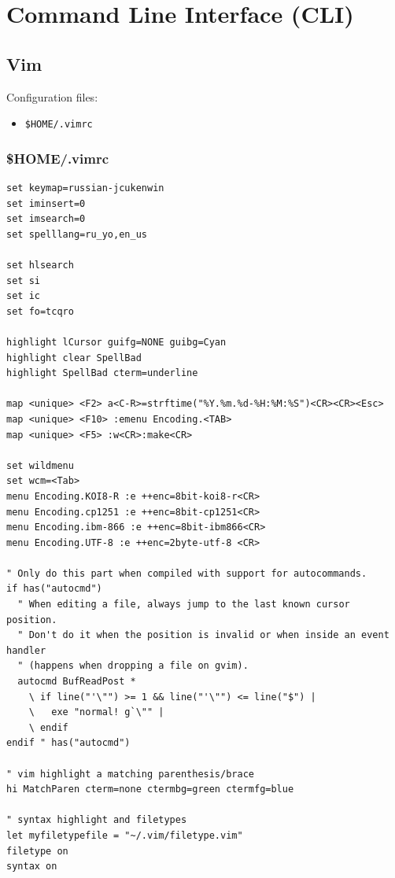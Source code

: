 \documentclass[12pt,a4paper]{article}
\begin{document}
\section{Command Line Interface (CLI)}

\subsection{Vim}

Configuration files:

\begin{itemize}
\item \verb"$HOME/.vimrc"
\end{itemize}

\subsubsection{\$HOME/.vimrc}

\begin{verbatim}
set keymap=russian-jcukenwin
set iminsert=0
set imsearch=0
set spelllang=ru_yo,en_us

set hlsearch
set si
set ic
set fo=tcqro

highlight lCursor guifg=NONE guibg=Cyan
highlight clear SpellBad
highlight SpellBad cterm=underline

map <unique> <F2> a<C-R>=strftime("%Y.%m.%d-%H:%M:%S")<CR><CR><Esc>
map <unique> <F10> :emenu Encoding.<TAB>
map <unique> <F5> :w<CR>:make<CR>

set wildmenu
set wcm=<Tab>
menu Encoding.KOI8-R :e ++enc=8bit-koi8-r<CR>
menu Encoding.cp1251 :e ++enc=8bit-cp1251<CR>
menu Encoding.ibm-866 :e ++enc=8bit-ibm866<CR>
menu Encoding.UTF-8 :e ++enc=2byte-utf-8 <CR>

" Only do this part when compiled with support for autocommands.
if has("autocmd")
  " When editing a file, always jump to the last known cursor position.
  " Don't do it when the position is invalid or when inside an event handler
  " (happens when dropping a file on gvim).
  autocmd BufReadPost *
    \ if line("'\"") >= 1 && line("'\"") <= line("$") |
    \   exe "normal! g`\"" |
    \ endif
endif " has("autocmd")

" vim highlight a matching parenthesis/brace
hi MatchParen cterm=none ctermbg=green ctermfg=blue

" syntax highlight and filetypes
let myfiletypefile = "~/.vim/filetype.vim"
filetype on
syntax on
\end{verbatim}
\end{document}
